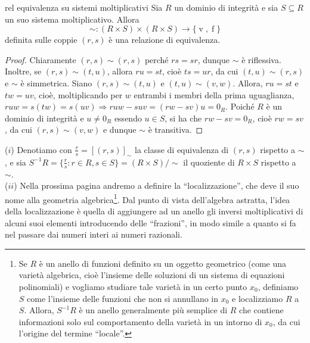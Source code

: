 \begin{prop}[1.7.1]{rel equivalenza su sistemi moltiplicativi}
  Sia $R$ un dominio di integrità e sia $S \subseteq R$ un suo sistema moltiplicativo. Allora 
  \vspace{-1.5mm}
  \[\sim\colon (R\times S)\times (R\times S)\to \{\operatorname{v},\operatorname{f}\}\]
  \vspace{-1.5mm}
  \noindent definita sulle coppie $(r, s)$ è una relazione di equivalenza.\footnotemark
\end{prop}
\vspace{-4mm}
\begin{proof}
  Chiaramente $(r,s)\sim (r,s)$ perché $rs=sr$, dunque $\sim$ è riflessiva. Inoltre, se $(r,s)\sim (t,u)$, allora $ru=st$, cioè $ts=ur$, 
  da cui $(t,u)\sim (r,s)$ e $\sim$ è simmetrica. Siano $(r,s)\sim (t,u)$ e $(t,u)\sim (v,w)$. Allora, $ru=st$ e $tw=uv$, cioè, 
  moltiplicando per $w$ entrambi i membri della prima uguaglianza, $ruw=s(tw)=s(uv) \Rightarrow ruw-suv=(rw-sv)u=0_R$. 
  Poiché $R$ è un dominio di integrità e $u\neq 0_R$ essendo $u\in S$, si ha che $rw-sv=0_R$, 
  cioè $rw=sv$, da cui $(r,s)\sim (v,w)$ e dunque $\sim$ è transitiva.
\end{proof}

\vspace{-2mm}
\begin{obs}
  ($i$) Denotiamo con $\frac{r}{s}=[(r,s)]_{\sim}$ la classe di equivalenza di $(r,s)$ rispetto a $\sim$, 
    e sia $S^{-1}R=\{\frac{r}{s}: r\in R,s\in S\}=(R\times S)/{\sim}$ il quoziente di $R\times S$ rispetto a $\sim$.   \vspace{1.5mm}\\
  ($ii$) Nella prossima pagina andremo a definire la ``localizzazione'', che deve il suo nome alla geometria 
  algebrica\footnote{Se $R$ è un anello di funzioni definito su un 
  oggetto geometrico (come una varietà algebrica, cioè l'insieme delle soluzioni di un sistema di equazioni polinomiali) e 
  vogliamo studiare tale varietà in un certo punto $x_0$, definiamo $S$ come l'insieme delle funzioni che non si annullano in $x_0$ e 
  localizziamo $R$ a $S$. Allora, $S^{-1}R$ è un anello generalmente più semplice di $R$ che contiene informazioni solo sul comportamento 
  della varietà in un intorno di $x_0$, da cui l'origine del termine ``locale''.}. Dal punto di vista dell'algebra astratta, 
  l'idea della localizzazione è quella di aggiungere ad un anello gli inversi moltiplicativi di alcuni suoi elementi 
  introducendo delle ``frazioni'', in modo simile a quanto si fa nel passare dai numeri interi ai numeri razionali.
\end{obs}

